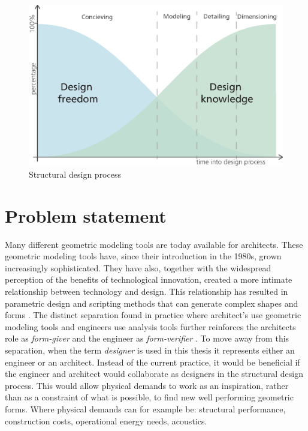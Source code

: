 \begin{figure}
  \includegraphics[width=350pt]{graphics/freedom-vs-knowledge.eps}
  \caption{Structural design process \cite{Mueller2014}}
  \label{fig:freedom-vs-knowledge}
\end{figure}

\section{Problem statement}
Many different geometric modeling tools are today available for architects. These geometric modeling tools have, since their introduction in the 1980s, grown increasingly sophisticated. They have also, together with the widespread perception of the benefits of technological innovation, created a more intimate relationship between technology and design. This relationship has resulted in parametric design and scripting methods that can generate complex shapes and forms \cite{sakamoto2008control}. The distinct separation found in practice where architect’s use geometric modeling tools and engineers use analysis tools further reinforces the architects role as \textit{form-giver }and the engineer as \textit{form-verifier }\cite{mueller2013integrated}. To move away from this separation, when the term \textit{designer }is used in this thesis it represents either an engineer or an architect. Instead of the current practice, it would be beneficial if the engineer and architect would collaborate as designers in the structural design process. This would allow physical demands to work as an inspiration, rather than as a constraint of what is possible, to find new well performing geometric forms. Where physical demands can for example be: structural performance, construction costs, operational energy needs, acoustics.

